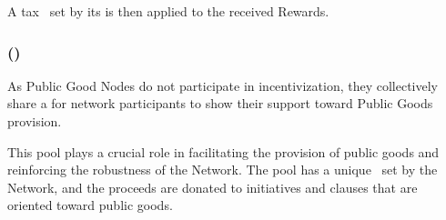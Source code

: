 A tax \tax\ set by its  is then applied to the received Rewards.

\subsubsection{ (\publicGoodPool)}

As Public Good Nodes do not participate in incentivization, they collectively share a  for network participants to show their support toward Public Goods provision.

This pool plays a crucial role in facilitating the provision of public goods and reinforcing the robustness of the Network.
The pool has a unique \tax\ set by the Network, and the proceeds are donated to initiatives and clauses that are oriented toward public goods.
